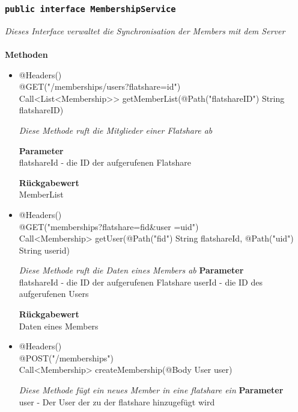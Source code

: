 \documentclass[a4paper]{scrreprt}
\begin{document}
             	\subsubsection{\texttt{public interface  MembershipService }}
        \textit{Dieses Interface verwaltet die Synchronisation der Members mit dem Server}\\
        \\
		\textbf{Methoden} \\
 			\begin{itemize}
        		\item{@Headers()\\ @GET("/memberships/users?flatshare={id}") \\ Call<List<Membership>> getMemberList(@Path("flatshareID") String flatshareID)}
        	
        		\textit{Diese Methode ruft die Mitglieder einer Flatshare ab}
        	
        		\textbf{Parameter} \\
                flatshareId - die ID der aufgerufenen Flatshare  
        		        	
       		 	\textbf{Rückgabewert} \\
                MemberList
      		  	 
      	      \item{@Headers()\\ @GET("memberships?flatshare={fid}\&user ={uid}")\\Call<Membership> getUser(@Path("fid") String flatshareId, @Path("uid") String userid)}
        	
      	 	 	\textit{Diese Methode ruft die Daten eines Members ab}        	
        		\textbf{Parameter} \\
        		flatshareId - die ID der aufgerufenen Flatshare 
                userId - die ID des aufgerufenen Users
        	
        		\textbf{Rückgabewert} \\
              Daten eines Members
        	
                      	 
      	      \item{@Headers()\\ @POST("/memberships")\\ Call<Membership> createMembership(@Body User user)}
        	
      	 	 	\textit{Diese Methode fügt ein neues Member in eine flatshare ein}        	
        		\textbf{Parameter} \\
        		user - Der User der zu der flatshare hinzugefügt wird 
        	

\end{itemize}
\end{document}
